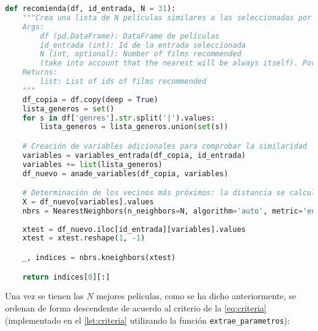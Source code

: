 \begin{lstlisting}[language=Python, caption= {Obtención de las 30 mejores películas dada una por el usuario. Es una de las funciones principales del proyecto. Calcula las variables de entrada del algoritmo de KNN y devuelve los ID de las películas más cercanas a la dada.}]
def recomienda(df, id_entrada, N = 31):
    """Crea una lista de N películas similares a las seleccionadas por el usuario
    Args:
        df (pd.DataFrame): DataFrame de películas
        id_entrada (int): Id de la entrada seleccionada
        N (int, optional): Number of films recommended 
        (take into account that the nearest will be always itself). Por defecto 31.
    Returns:
        list: List of ids of films recommended
    """
    df_copia = df.copy(deep = True)    
    lista_generos = set()
    for s in df['genres'].str.split('|').values:
        lista_generos = lista_generos.union(set(s))    

    # Creación de variables adicionales para comprobar la similaridad
    variables = variables_entrada(df_copia, id_entrada)
    variables += list(lista_generos)
    df_nuevo = anade_variables(df_copia, variables)

    # Determinación de los vecinos más próximos: la distancia se calcula con las nuevas vairables
    X = df_nuevo[variables].values
    nbrs = NearestNeighbors(n_neighbors=N, algorithm='auto', metric='euclidean').fit(X)
    
    xtest = df_nuevo.iloc[id_entrada][variables].values
    xtest = xtest.reshape(1, -1)

    _, indices = nbrs.kneighbors(xtest)

    return indices[0][:]
\end{lstlisting}

Una vez se tienen las $N$ mejores películas, como se ha dicho anteriormente, se ordenan de forma descendente de acuerdo al criterio de la \autoref{eq:criteria} (implementado en el \autoref{lst:criteria} utilizando la función \texttt{extrae\_parametros}):

